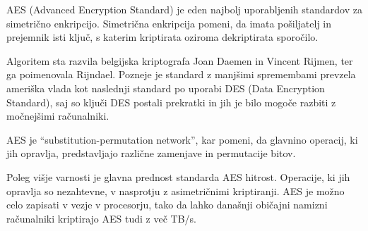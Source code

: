 AES (Advanced Encryption Standard) je eden najbolj uporabljenih standardov za simetrično enkripcijo. Simetrična enkripcija pomeni, da imata pošiljatelj in prejemnik isti ključ, s katerim kriptirata oziroma dekriptirata sporočilo.

Algoritem sta razvila belgijska kriptografa Joan Daemen in Vincent Rijmen, ter ga poimenovala Rijndael. Pozneje je standard z manjšimi spremembami prevzela ameriška vlada kot naslednji standard po uporabi DES (Data Encryption Standard), saj so ključi DES postali prekratki in jih je bilo mogoče razbiti z močnejšimi računalniki.

AES je ``substitution-permutation network'', kar pomeni, da glavnino operacij, ki jih opravlja, predstavljajo različne zamenjave in permutacije bitov.

Poleg višje varnosti je glavna prednost standarda AES hitrost. Operacije, ki jih opravlja so nezahtevne, v nasprotju z asimetričnimi kriptiranji. AES je možno celo zapisati v vezje v procesorju, tako da lahko današnji običajni namizni računalniki kriptirajo AES tudi z več TB/s.

